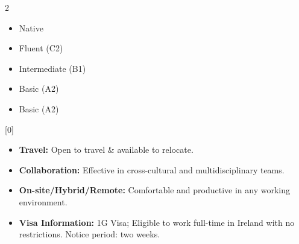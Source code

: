 \documentclass[a4paper,11pt]{article}
\begin{document}
\begin{multicols}{2}

\begin{itemize} [leftmargin=1.2em]
\setlength{\itemsep}{-5pt}
    \item {} {Native}
    \item {} {Fluent (C2)} 
    \item {} {Intermediate (B1)}
    \item {} {Basic (A2)}
    \item {}  {Basic (A2)}

\end{itemize}
\cvsection{}[0]
\columnbreak

\begin{itemize}[leftmargin=0.2em]
\setlength{\itemsep}{0pt}
    \item {} \textbf{Travel:} Open to travel \& available to relocate.
    \item {} \textbf{Collaboration:} Effective in cross-cultural and multidisciplinary teams.
    \item {} \textbf{On-site/Hybrid/Remote:} Comfortable and productive in any working environment.
    \item {} \textbf{Visa Information:} 1G Visa; Eligible to work full-time in Ireland with no restrictions. Notice period: two weeks.

\end{itemize}
\end{multicols}
\end{document}
